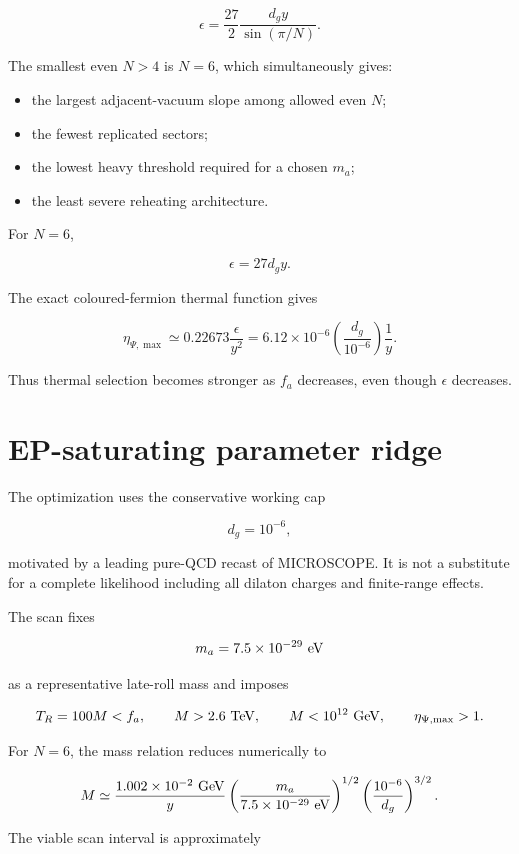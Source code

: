 \documentclass[
  10pt,
]{article}
\providecommand{\tightlist}{%
  \setlength{\itemsep}{0pt}\setlength{\parskip}{0pt}}
\begin{document}
\[
\epsilon=
\frac{27}{2}
\frac{d_g y}{\sin(\pi/N)}.
\]

The smallest even \(N>4\) is \(N=6\), which simultaneously gives:

\begin{itemize}
\tightlist
\item
  the largest adjacent-vacuum slope among allowed even \(N\);
\item
  the fewest replicated sectors;
\item
  the lowest heavy threshold required for a chosen \(m_a\);
\item
  the least severe reheating architecture.
\end{itemize}

For \(N=6\),

\[
\boxed{\epsilon=27d_gy}.
\]

The exact coloured-fermion thermal function gives

\[
\eta_{\Psi,\max}
\simeq0.22673\frac{\epsilon}{y^2}
=6.12\times10^{-6}
\left(\frac{d_g}{10^{-6}}\right)\frac1y.
\]

Thus thermal selection becomes stronger as \(f_a\) decreases, even
though \(\epsilon\) decreases.

\section{EP-saturating parameter
ridge}\label{ep-saturating-parameter-ridge}

The optimization uses the conservative working cap

\[
d_g=10^{-6},
\]

motivated by a leading pure-QCD recast of MICROSCOPE. It is not a
substitute for a complete likelihood including all dilaton charges and
finite-range effects.

The scan fixes

\[
m_a=7.5\times10^{-29}\ {\rm eV}
\]

as a representative late-roll mass and imposes

\[
T_R=100M<f_a,
\qquad
M>2.6\ {\rm TeV},
\qquad
M<10^{12}\ {\rm GeV},
\qquad
\eta_{\Psi,\max}>1.
\]

For \(N=6\), the mass relation reduces numerically to

\[
M\simeq
\frac{1.002\times10^{-2}\ {\rm GeV}}{y}
\left(\frac{m_a}{7.5\times10^{-29}\ {\rm eV}}\right)^{1/2}
\left(\frac{10^{-6}}{d_g}\right)^{3/2}.
\]

The viable scan interval is approximately
\end{document}
